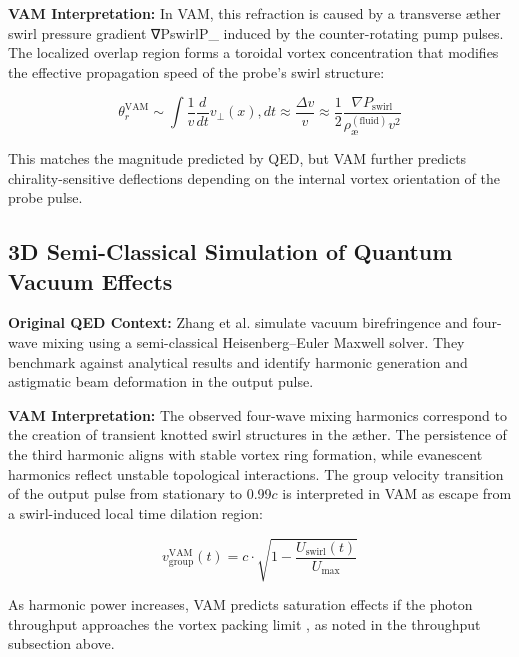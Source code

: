 \textbf{VAM Interpretation:} In VAM, this refraction is caused by a transverse \ae{}ther swirl pressure gradient ∇Pswirl\nabla P_ induced by the counter-rotating pump pulses. The localized overlap region forms a toroidal vortex concentration that modifies the effective propagation speed of the probe's swirl structure:

\begin{equation}

\theta_r^\text{VAM} \sim \int \frac{1}{v} \frac{d}{dt} v_\perp(x) , dt \approx \frac{\Delta v}{v} \approx \frac{1}{2} \frac{\nabla P_\text{swirl}}{\rho_\text{\ae}^{(\text{fluid})} v^2}

\end{equation}

This matches the magnitude predicted by QED, but VAM further predicts chirality-sensitive deflections depending on the internal vortex orientation of the probe pulse.


\subsection{3D Semi-Classical Simulation of Quantum Vacuum Effects\cite{zhang2025computational}}


\textbf{Original QED Context:} Zhang et al. simulate vacuum birefringence and four-wave mixing using a semi-classical Heisenberg--Euler Maxwell solver. They benchmark against analytical results and identify harmonic generation and astigmatic beam deformation in the output pulse.


\textbf{VAM Interpretation:} The observed four-wave mixing harmonics correspond to the creation of transient knotted swirl structures in the \ae{}ther. The persistence of the third harmonic aligns with stable vortex ring formation, while evanescent harmonics reflect unstable topological interactions. The group velocity transition of the output pulse from stationary to 0.99$c$ is interpreted in VAM as escape from a swirl-induced local time dilation region:

\begin{equation}

v_\text{group}^\text{VAM}(t) = c \cdot \sqrt{1 - \frac{U_\text{swirl}(t)}{U_\text{max}}}

\end{equation}



As harmonic power increases, VAM predicts saturation effects if the photon throughput approaches the vortex packing limit , as noted in the throughput subsection above.

